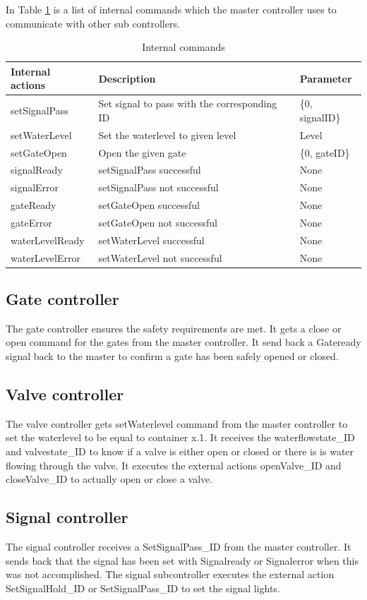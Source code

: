 In Table \ref{tab:internal} is a list of internal commands which the master controller uses to communicate with other sub controllers.

\begin{table}[htbp]
	\centering
	\caption{Internal commands}
	\begin{tabular}{lll}
		\toprule
		\textbf{Internal actions} & \textbf{Description} & \textbf{Parameter} \\
		\midrule
		setSignalPass & Set signal to pass with the corresponding ID  & \{0, signalID\} \\
		setWaterLevel & Set the waterlevel to given level & Level\\
		setGateOpen & Open the given gate & \{0, gateID\} \\
		signalReady & setSignalPass successful & None\\
		signalError & setSignalPass not successful & None \\
		gateReady & setGateOpen successful & None\\
		gateError & setGateOpen not successful & None\\
		waterLevelReady & setWaterLevel successful & None\\
		waterLevelError & setWaterLevel not successful & None\\
		\bottomrule
	\end{tabular}%
	\label{tab:internal}%
\end{table}%


\subsection{Gate controller}
The gate controller ensures the safety requirements are met. It gets a close or open command for the gates from the master controller. It send back a Gateready signal back to the master to confirm a gate has been safely opened or closed. 
\subsection{Valve controller}
The valve controller gets setWaterlevel command from the master controller to set the waterlevel to be equal to container x.1. It receives the waterflowstate\_ID and valvestate\_ID to know if a valve is either open or closed or there is is water flowing through the valve. It executes the external actions openValve\_ID and closeValve\_ID to actually open or close a valve.  
\subsection{Signal controller}
The signal controller receives a SetSignalPass\_ID from the master controller. It sends back that the signal has been set with Signalready or Signalerror when this was not accomplished. The signal subcontroller executes the external action SetSignalHold\_ID or SetSignalPass\_ID to set the signal lights. 
